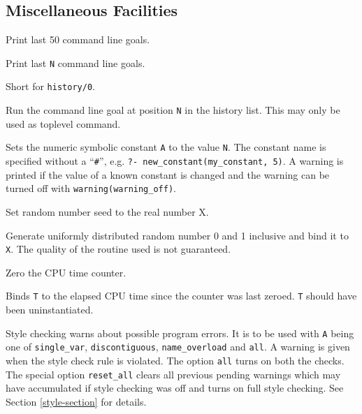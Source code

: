 \subsection{Miscellaneous Facilities}

\begin{description}

Print last 50 command line goals.

\chgbarbegin
{}
Print last {\tt N} command line goals.
\chgbarend

Short for {\tt history/0}.

Run the command line goal at position {\tt N} in the history list.
This may only be used as toplevel command.

 
\chgbarbegin
Sets the numeric symbolic constant {\tt A} to the value {\tt N}.
The constant name is specified without a ``{\tt \#}'',
e.g. {\tt ?- new\_constant(my\_constant, 5)}.
A warning is printed if the value of a known constant is changed
and the warning can be turned off with {\tt warning(warning\_off)}.
\chgbarend

Set random number seed to the real number X.

Generate uniformly distributed random number 0 and 1 inclusive and bind it to
{\tt X}. The quality of the routine used is not guaranteed. 

Zero the CPU time counter.

Binds {\tt T} to the elapsed CPU 
time since the counter was last zeroed. {\tt T}
should have been uninstantiated.

\chgbarbegin
{}
Style checking warns about possible program errors. It is to be used
with {\tt A} being one of {\tt single\_var}, {\tt discontiguous},
{\tt name\_overload} and {\tt all}.
A warning is given when the style check rule is violated.
The option {\tt all} turns on both the checks.
The special option {\tt reset\_all} clears all previous pending
warnings which may have accumulated if style checking was off
and turns on full style checking.
See Section \ref{style-section} for details.


\end{description}
